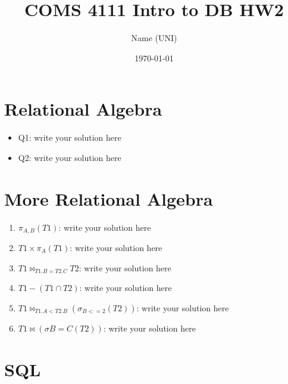 \documentclass{article}
\title{COMS 4111 Intro to DB HW2}
\author{Name (UNI)}
\date{\today}
\begin{document}
\maketitle



\pagebreak

\section{Relational Algebra}
\begin{itemize}
    \item Q1: write your solution here
    
    \item Q2: write your solution here
    
\end{itemize}

\newpage

\section{More Relational Algebra}

\begin{enumerate}
    \item $\pi_{A,B}(T1)$: write your solution here
    
    \item $T1 \times \pi _A(T1)$: write your solution here
    
    \item $T1 \bowtie_{T1.B=T2.C} T2$: write your solution here 
    
    \item $T1 - (T1 \cap T2)$: write your solution here 
    
    \item $T1 \bowtie_{T1.A < T2.B} (\sigma_{B<=2}(T2))$: write your solution here 
    
    \item $T1 \bowtie (\sigma{B=C}(T2))$: write your solution here 
\end{enumerate}

\newpage

\section{SQL}
\end{document}
